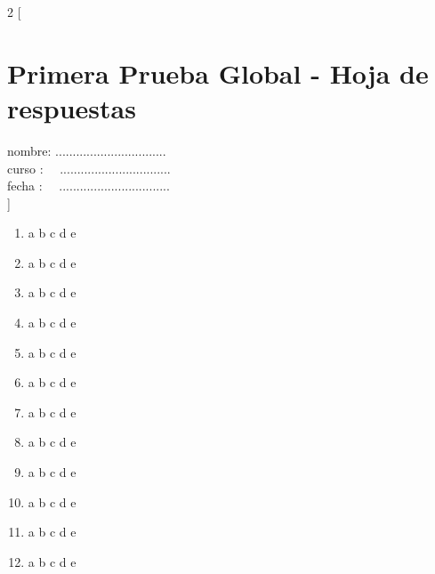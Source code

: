 \documentclass[8pt]{article}
\begin{document}
 \setcounter{page}{0}
    \setcounter{page}{1}
\newpage  
 \begin{multicols*}{2}
[
\section{Primera Prueba Global - Hoja de respuestas}
nombre:   ................................\\
curso :     \ \ ................................\\
fecha :   \ \ ................................\\
]
\begin{enumerate}
\item \large \textcircled{\small{a}} \textcircled{\small{b}} \textcircled{\small{c}} \textcircled{\small{d}} \textcircled{\small{e}}
\item \large \textcircled{\small{a}} \textcircled{\small{b}} \textcircled{\small{c}} \textcircled{\small{d}} \textcircled{\small{e}}
\item \large \textcircled{\small{a}} \textcircled{\small{b}} \textcircled{\small{c}} \textcircled{\small{d}} \textcircled{\small{e}}
\item \large \textcircled{\small{a}} \textcircled{\small{b}} \textcircled{\small{c}} \textcircled{\small{d}} \textcircled{\small{e}}
\item \large \textcircled{\small{a}} \textcircled{\small{b}} \textcircled{\small{c}} \textcircled{\small{d}} \textcircled{\small{e}}
\item \large \textcircled{\small{a}} \textcircled{\small{b}} \textcircled{\small{c}} \textcircled{\small{d}} \textcircled{\small{e}}
\item \large \textcircled{\small{a}} \textcircled{\small{b}} \textcircled{\small{c}} \textcircled{\small{d}} \textcircled{\small{e}}
\item \large \textcircled{\small{a}} \textcircled{\small{b}} \textcircled{\small{c}} \textcircled{\small{d}} \textcircled{\small{e}}
\item \large \textcircled{\small{a}} \textcircled{\small{b}} \textcircled{\small{c}} \textcircled{\small{d}} \textcircled{\small{e}}
\item \large \textcircled{\small{a}} \textcircled{\small{b}} \textcircled{\small{c}} \textcircled{\small{d}} \textcircled{\small{e}}
\item \large \textcircled{\small{a}} \textcircled{\small{b}} \textcircled{\small{c}} \textcircled{\small{d}} \textcircled{\small{e}}
\item \large \textcircled{\small{a}} \textcircled{\small{b}} \textcircled{\small{c}} \textcircled{\small{d}} \textcircled{\small{e}}

\end{enumerate}
\end{multicols*}
\end{document}
